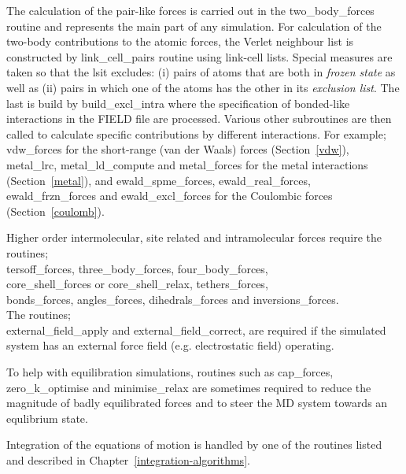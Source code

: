 The calculation of the pair-like forces is carried out in the
{\sc two\_body\_forces} routine and represents the main part of any
simulation.  For calculation of the two-body contributions to the
atomic forces, the Verlet neighbour list
is constructed by {\sc link\_cell\_pairs} routine using link-cell
lists.  Special measures are taken so that the lsit excludes: (i)
pairs of atoms that are both in {\em frozen state} as well as (ii)
pairs in which one of the atoms has the other in its
{\em exclusion list}.  The last is build by {\sc build\_excl\_intra}
where the specification of bonded-like interactions in the FIELD file
are processed.  Various other subroutines are then called to
calculate specific contributions by different interactions.  For example;
{\sc vdw\_forces} for the short-range (van der Waals)
forces (Section~\ref{vdw}), {\sc metal\_lrc}, {\sc metal\_ld\_compute} and
{\sc metal\_forces} for the metal interactions 
(Section~\ref{metal}), and {\sc ewald\_spme\_forces}, {\sc ewald\_real\_forces},
{\sc ewald\_frzn\_forces} and {\sc ewald\_excl\_forces} for the
Coulombic forces (Section~\ref{coulomb}).

Higher order intermolecular, site
related and intramolecular forces
require the routines; \\
{\sc tersoff\_forces}, {\sc three\_body\_forces},
{\sc four\_body\_forces}, \\
{\sc core\_shell\_forces} or {\sc core\_shell\_relax},
{\sc tethers\_forces}, \\
{\sc bonds\_forces}, {\sc angles\_forces}, {\sc dihedrals\_forces}
and {\sc inversions\_forces}.  \\
The routines; \\
{\sc external\_field\_apply} and {\sc external\_field\_correct},
are required if the simulated system has an external force field
(e.g. electrostatic field) operating.

To help with equilibration simulations, routines such as
{\sc cap\_forces}, {\sc zero\_k\_optimise} and {\sc minimise\_relax}
are sometimes required to reduce the magnitude of badly
equilibrated forces and to steer the MD system towards an
equlibrium state.

Integration of the equations of motion is handled by one of the
routines listed and described in Chapter~\ref{integration-algorithms}.

